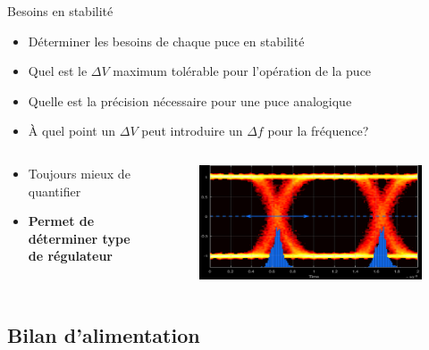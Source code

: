 \begin{frame}{Besoins en stabilité}
    \begin{itemize}
        \item Déterminer les besoins de chaque puce en stabilité
        \item Quel est le $\Delta V$ maximum tolérable pour l'opération de la puce
        \item Quelle est la précision nécessaire pour une puce analogique
        \item À quel point un $\Delta V$ peut introduire un $\Delta f$ pour la fréquence?
    \end{itemize}

    \begin{columns}
        \begin{column}{0.5\textwidth}
             {
            \begin{itemize}
                \item Toujours mieux de quantifier
                \item \textbf{Permet de déterminer type de régulateur}
            \end{itemize}
            }
        \end{column}
        \begin{column}{0.5\textwidth}
            \begin{figure}
                \includegraphics[width=\textwidth, height=0.45\textheight, keepaspectratio]{pictures/eye-diagram.png}
            \end{figure}
        \end{column}
    \end{columns}
\end{frame}


\subsection{Bilan d'alimentation}

